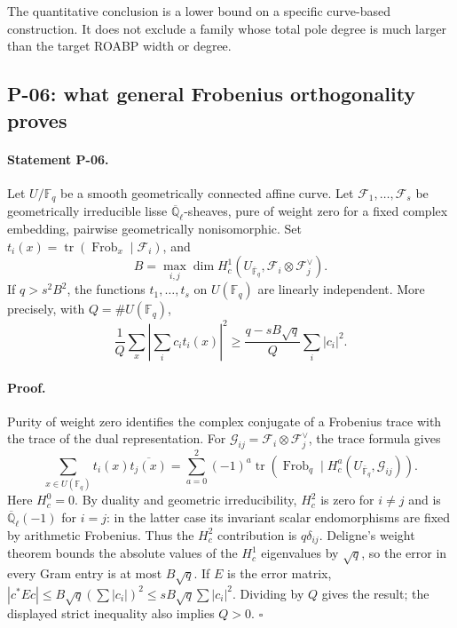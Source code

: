 \documentclass[11pt,a4paper]{article}
\theoremstyle{definition}\newtheorem{definition}{Definition}
\begin{document}
The quantitative conclusion is a lower bound on a specific curve-based construction. It does not exclude a family whose total pole degree is much larger than the target ROABP width or degree.

\subsection{P-06: what general Frobenius orthogonality proves}
\paragraph{Statement P-06.}
Let $U/\mathbb F_q$ be a smooth geometrically connected affine curve. Let $\mathcal F_1,\ldots,\mathcal F_s$ be geometrically irreducible lisse $\overline{\mathbb Q}_\ell$-sheaves, pure of weight zero for a fixed complex embedding, pairwise geometrically nonisomorphic. Set $t_i(x)=\operatorname{tr}(\operatorname{Frob}_x\mid\mathcal F_i)$, and
\[
 B=\max_{i,j}\dim H_c^1(U_{\overline{\mathbb F}_q},\mathcal F_i\otimes\mathcal F_j^\vee).
\]
If $q>s^2B^2$, the functions $t_1,\ldots,t_s$ on $U(\mathbb F_q)$ are linearly independent. More precisely, with $Q=\#U(\mathbb F_q)$,
\[
 \frac1Q\sum_x\left|\sum_i c_it_i(x)\right|^2
 \ge\frac{q-sB\sqrt q}{Q}\sum_i|c_i|^2.
\]
\paragraph{Proof.}
Purity of weight zero identifies the complex conjugate of a Frobenius trace with the trace of the dual representation. For $\mathcal G_{ij}=\mathcal F_i\otimes\mathcal F_j^\vee$, the trace formula gives
\[
 \sum_{x\in U(\mathbb F_q)}t_i(x)\overline{t_j(x)}
 =\sum_{a=0}^2(-1)^a\operatorname{tr}(\operatorname{Frob}_q\mid H_c^a(U_{\bar{\mathbb F}_q},\mathcal G_{ij})).
\]
Here $H_c^0=0$. By duality and geometric irreducibility, $H_c^2$ is zero for $i\ne j$ and is $\overline{\mathbb Q}_\ell(-1)$ for $i=j$: in the latter case its invariant scalar endomorphisms are fixed by arithmetic Frobenius. Thus the $H_c^2$ contribution is $q\delta_{ij}$. Deligne's weight theorem bounds the absolute values of the $H_c^1$ eigenvalues by $\sqrt q$, so the error in every Gram entry is at most $B\sqrt q$. If $E$ is the error matrix, $|c^*Ec|\le B\sqrt q(\sum|c_i|)^2\le sB\sqrt q\sum|c_i|^2$. Dividing by $Q$ gives the result; the displayed strict inequality also implies $Q>0$. $\square$
\end{document}
